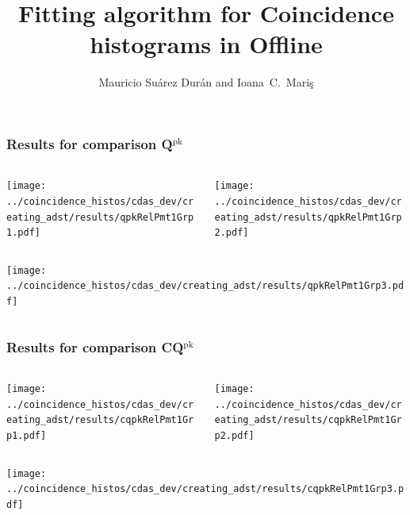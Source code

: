 \documentclass[aspectratio=169]{beamer}
\title{Fitting algorithm for Coincidence histograms in Offline}
\author{
  Mauricio Su\'arez Dur\'an and Ioana~C.~Mari\c{s}
}
\institute{IIHE-ULB}
\begin{document}
\begin{frame}
  \titlepage
\end{frame}

\begin{frame}
  \frametitle{Results for comparison Q$^{\mathrm{pk}}$}

  \begin{columns}
    \centering
    \begin{column}{0.5\textwidth}
      \texttt{[image: ../coincidence\_histos/cdas\_dev/creating\_adst/results/qpkRelPmt1Grp1.pdf]}
    \end{column}
    \begin{column}{0.5\textwidth}
      \texttt{[image: ../coincidence\_histos/cdas\_dev/creating\_adst/results/qpkRelPmt1Grp2.pdf]}
    \end{column}
  \end{columns}

  \begin{columns}
    \centering
    \begin{column}{0.5\textwidth}
      \texttt{[image: ../coincidence\_histos/cdas\_dev/creating\_adst/results/qpkRelPmt1Grp3.pdf]}
    \end{column}
  \end{columns}
\end{frame}

\begin{frame}
  \frametitle{Results for comparison CQ$^{\mathrm{pk}}$}

  \begin{columns}
    \centering
    \begin{column}{0.5\textwidth}
      \texttt{[image: ../coincidence\_histos/cdas\_dev/creating\_adst/results/cqpkRelPmt1Grp1.pdf]}
    \end{column}
    \begin{column}{0.5\textwidth}
      \texttt{[image: ../coincidence\_histos/cdas\_dev/creating\_adst/results/cqpkRelPmt1Grp2.pdf]}
    \end{column}
  \end{columns}

  \begin{columns}
    \centering
    \begin{column}{0.5\textwidth}
      \texttt{[image: ../coincidence\_histos/cdas\_dev/creating\_adst/results/cqpkRelPmt1Grp3.pdf]}
    \end{column}
  \end{columns}
\end{frame}
\end{document}

